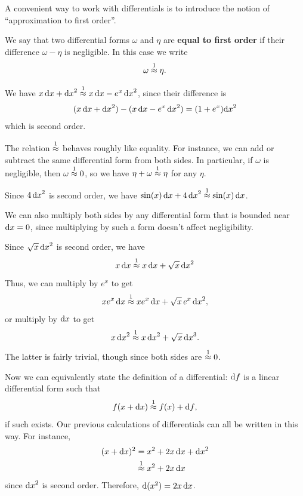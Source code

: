 \documentclass[12pt]{amsart}
\begin{document}
A convenient way to work with differentials is to introduce the notion of ``approximation to first order''.

\begin{defn}
  We say that two differential forms $\omega$ and $\eta$ are \textbf{equal to first order} if their difference $\omega-\eta$ is negligible.
  In this case we write
  \[\omega\mathrel{\overset{1}{\approx}} \eta.\]
\end{defn}

\begin{eg}
  We have $x\,{\mathrm{d} x} + {\mathrm{d} x}^2 \mathrel{\overset{1}{\approx}} x\,{\mathrm{d} x} - e^x \,{\mathrm{d} x}^2$, since their difference is
  \[ (x\,{\mathrm{d} x} + {\mathrm{d} x}^2) - (x\,{\mathrm{d} x} - e^x\, {\mathrm{d} x}^2) = (1+e^x){\mathrm{d} x}^2 \]
  which is second order.
\end{eg}

The relation $\mathrel{\overset{1}{\approx}}$ behaves roughly like equality.
For instance, we can add or subtract the same differential form from both sides.
In particular, if $\omega$ is negligible, then $\omega\mathrel{\overset{1}{\approx}}0$, so we have $\eta + \omega \mathrel{\overset{1}{\approx}} \eta$ for any $\eta$.

\begin{eg}
  Since $4\,{\mathrm{d} x}^2$ is second order, we have $\sin(x) \,{\mathrm{d} x} + 4\, {\mathrm{d} x}^2 \mathrel{\overset{1}{\approx}} \sin(x)\,{\mathrm{d} x}$.
\end{eg}

We can also multiply both sides by any differential form that is bounded near ${\mathrm{d} x}=0$, since multiplying by such a form doesn't affect negligibility.

\begin{eg}
  Since $\sqrt{x}\, {\mathrm{d} x}^2$ is second order, we have
  \[x\,{\mathrm{d} x} \mathrel{\overset{1}{\approx}} x\,{\mathrm{d} x} + \sqrt{x}\, {\mathrm{d} x}^2\]
  Thus, we can multiply by $e^x$ to get
  \[x e^x \,{\mathrm{d} x} \mathrel{\overset{1}{\approx}} x e^x\,{\mathrm{d} x} + \sqrt{x}\, e^x\, {\mathrm{d} x}^2,\]
  or multiply by ${\mathrm{d} x}$ to get
  \[x\,{\mathrm{d} x}^2 \mathrel{\overset{1}{\approx}} x\,{\mathrm{d} x}^2 + \sqrt{x} \,{\mathrm{d} x}^3. \]
  The latter is fairly trivial, though since both sides are $\mathrel{\overset{1}{\approx}} 0$.
\end{eg}

Now we can equivalently state the definition of a differential: ${\mathrm{d} f}$ is a linear differential form such that
\[ f(x+{\mathrm{d} x}) \mathrel{\overset{1}{\approx}} f(x) + {\mathrm{d} f}, \]
if such exists.
Our previous calculations of differentials can all be written in this way.
For instance,
\begin{align*}
  (x+{\mathrm{d} x})^2 &= x^2 + 2 x\,{\mathrm{d} x} + {\mathrm{d} x}^2\\
  &\mathrel{\overset{1}{\approx}} x^2 + 2 x\,{\mathrm{d} x}
\end{align*}
since ${\mathrm{d} x}^2$ is second order.
Therefore, $\mathrm{d}(x^2) = 2x\,{\mathrm{d} x}$.

\end{document}
